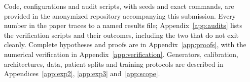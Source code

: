 Code, configurations and audit scripts, with seeds and exact commands, are
provided in the anonymized repository accompanying this submission. Every
number in the paper traces to a named results file;
Appendix~\ref{app:audits} lists the verification scripts and their outcomes,
including the two that do not exit cleanly. Complete hypotheses and proofs
are in Appendix~\ref{app:proofs}, with the numerical verification in
Appendix~\ref{app:verification}. Generators, calibration, architectures,
data, patient splits and training protocols are described in
Appendices~\ref{app:exp2}, \ref{app:exp3} and~\ref{app:scope}.
